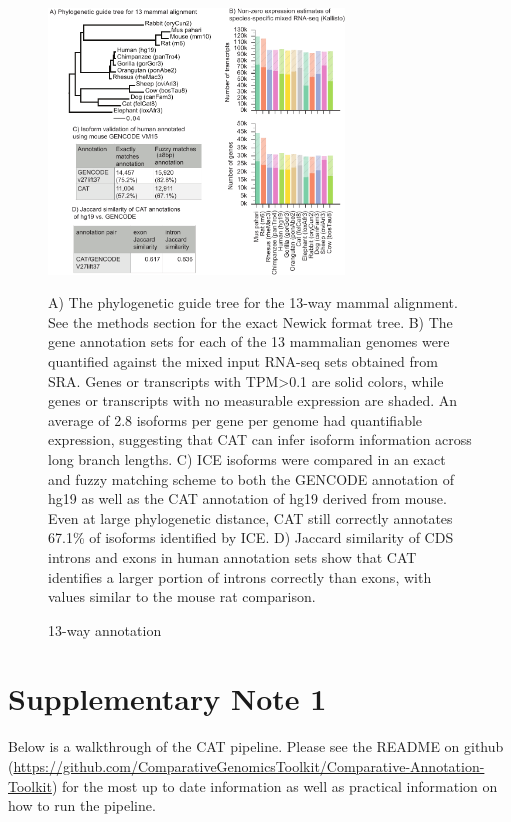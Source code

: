 \documentclass[fleqn,10pt]{wlscirep}
\newcommand{\beginsupplement}{%
        \setcounter{table}{0}
        \renewcommand{\thetable}{S\arabic{table}}%
        \setcounter{figure}{0}
        \renewcommand{\thefigure}{S\arabic{figure}}%
     }
\begin{document}
\begin{figure}
\centering
\includegraphics[width=0.7\textwidth,height=0.7\textheight,keepaspectratio]{13way-v4.pdf}
\caption{13-way annotation}
A) The phylogenetic guide tree for the 13-way mammal alignment. See the methods section for the exact Newick format tree. B) The gene annotation sets for each of the 13 mammalian genomes were quantified against the mixed input RNA-seq sets obtained from SRA. Genes or transcripts with TPM\textgreater 0.1 are solid colors, while genes or transcripts with no measurable expression are shaded. An average of 2.8  isoforms per gene per genome had quantifiable expression, suggesting that CAT can infer isoform information across long branch lengths. C) ICE isoforms were compared in an exact and fuzzy matching scheme to both the GENCODE annotation of hg19 as well as the CAT annotation of hg19 derived from mouse. Even at large phylogenetic distance, CAT still correctly annotates 67.1\% of isoforms identified by ICE. D) Jaccard similarity of CDS introns and exons in human annotation sets show that CAT identifies a larger portion of introns correctly than exons, with values similar to the mouse rat comparison.
\label{fig:13way}
\end{figure}

\clearpage
\beginsupplement

\section*{Supplementary Note 1}

Below is a walkthrough of the CAT pipeline. Please see the README on github (\url{https://github.com/ComparativeGenomicsToolkit/Comparative-Annotation-Toolkit}) for the most up to date information as well as practical information on how to run the pipeline. 
\end{document}
